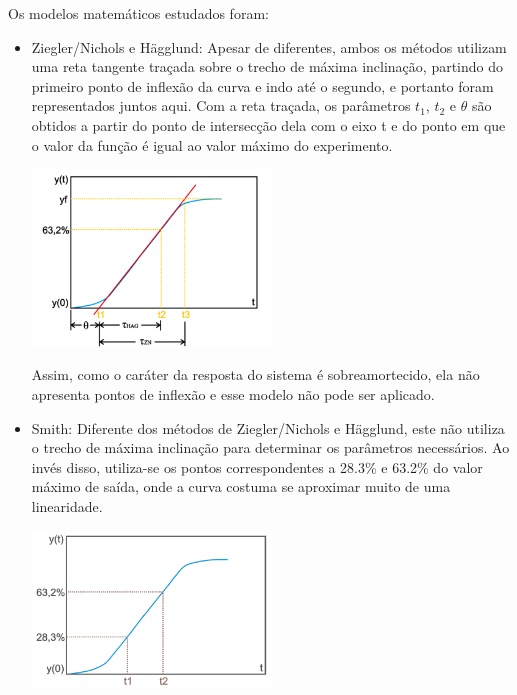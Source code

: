 \documentclass[
	article,			%
	11pt,				%
	oneside,			%
	a4paper,			%
	section=TITLE,		%
	english,			%
	brazil,				%
	sumario=tradicional
	]{abntex2}
\begin{document}
Os modelos matemáticos estudados foram:
\label{sec:metodo-modelos}
\begin{itemize}
    \item Ziegler/Nichols e Hägglund: Apesar de diferentes, ambos os métodos utilizam uma reta tangente traçada sobre o trecho de máxima inclinação, partindo do primeiro ponto de inflexão da curva e indo até o segundo, e portanto foram representados juntos aqui. Com a reta traçada, os parâmetros $t_1$, $t_2$ e $\theta$ são obtidos a partir do ponto de intersecção dela com o eixo t e do ponto em que o valor da função é igual ao valor máximo do experimento.
    
    \begin{minipage}{\linewidth}
        \centering
        \includegraphics[width=0.5\textwidth]{img/ex-zn.png}
        \label{fig:ex-zn}
    \end{minipage}  
    
    Assim, como o caráter da resposta do sistema é sobreamortecido, ela não apresenta pontos de inflexão e esse modelo não pode ser aplicado.

    \item Smith: Diferente dos métodos de Ziegler/Nichols e Hägglund, este não utiliza o trecho de máxima inclinação para determinar os parâmetros necessários. Ao invés disso, utiliza-se os pontos correspondentes a 28.3\% e 63.2\% do valor máximo de saída, onde a curva costuma se aproximar muito de uma linearidade. 
    
    \begin{minipage}{\linewidth}
        \centering
        \includegraphics[width=0.5\textwidth]{img/ex-smith.png}
        \label{fig:ex-smith}
    \end{minipage}
    

\end{itemize}
\end{document}
